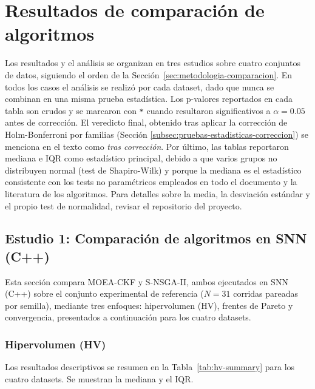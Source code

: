 

\providecommand{\Atwelve}{\ensuremath{\hat{A}_{12}}}

\section{Resultados de comparación de algoritmos}
\label{sec:resultados-discusion}

Los resultados y el análisis se organizan en tres estudios sobre cuatro conjuntos de datos, siguiendo el orden de la Sección~\ref{sec:metodologia-comparacion}. En todos los casos el análisis se realizó por cada dataset, dado que nunca se combinan en una misma prueba estadística. Los p-valores reportados en cada tabla son crudos y se marcaron con \texttt{*} cuando resultaron significativos a $\alpha=0.05$ antes de corrección. El veredicto final, obtenido tras aplicar la corrección de Holm-Bonferroni por familias (Sección \ref{subsec:pruebas-estadisticas-correccion}) se menciona en el texto como \textit{tras corrección}. Por último, las tablas reportaron mediana e IQR como estadístico principal, debido a que varios grupos no distribuyen normal (test de Shapiro-Wilk) y porque la mediana es el estadístico consistente con los tests no paramétricos empleados en todo el documento y la literatura de los algoritmos. Para detalles sobre la media, la desviación estándar y el propio test de normalidad, revisar el repositorio del proyecto.

\subsection{Estudio 1: Comparación de algoritmos en SNN (C++)}
\label{sec:estudio1}

Esta sección compara MOEA-CKF y S-NSGA-II, ambos ejecutados en SNN (C++) sobre el conjunto experimental de referencia ($N=31$ corridas pareadas por semilla), mediante tres enfoques: hipervolumen (HV), frentes de Pareto y convergencia, presentados a continuación para los cuatro datasets.

\subsubsection{Hipervolumen (HV)}\label{sec:hv}
Los resultados descriptivos se resumen en la Tabla~\ref{tab:hv-summary} para los cuatro datasets. Se muestran la mediana y el IQR.

